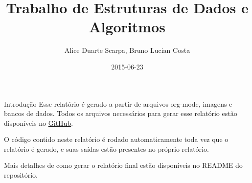 \documentclass[presentation]{beamer}
\author{Alice Duarte Scarpa, Bruno Lucian Costa}
\date{2015-06-23}
\title{Trabalho de Estruturas de Dados e Algoritmos}
\begin{document}
\maketitle

\begin{frame}[label=sec-1]{Introdução}
Esse relatório é gerado a partir de arquivos org-mode, imagens e
bancos de dados. Todos os arquivos necessários para gerar esse
relatório estão disponíveis no \href{https://github.com/adusca/FGV-EDA}{GitHub}.

O código contido neste relatório é rodado automaticamente toda vez que
o relatório é gerado, e suas saídas estão presentes no próprio
relatório.

Mais detalhes de como gerar o relatório final estão disponíveis no
README do repositório.
\end{frame}
\end{document}

